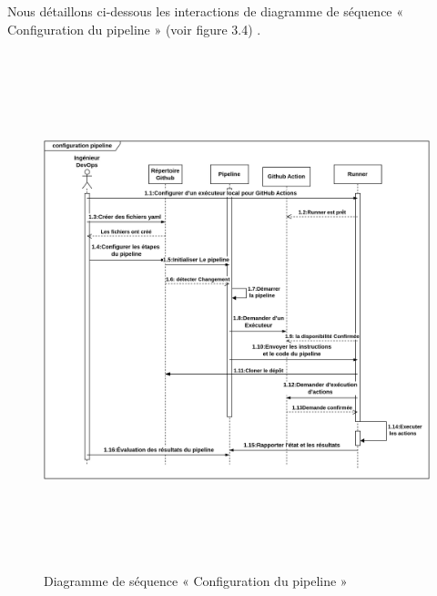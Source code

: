             Nous détaillons ci-dessous les interactions de diagramme de séquence « Configuration du pipeline » (voir figure 3.4)  .
            \begin{figure}[H]
                \begin{center}
                \includegraphics[height=15cm,width=18cm]{SEQPIPELINE.png}
                \end{center}
                \caption{Diagramme de séquence « Configuration du pipeline »}
                \end{figure}
            
